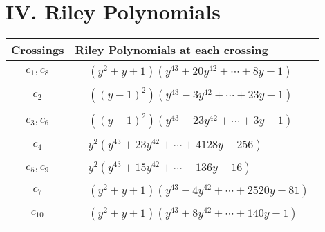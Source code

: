 \documentclass[1p]{elsarticle_modified}
\theoremstyle{definition}
\begin{document}
\centering \section*{ IV. Riley Polynomials}
\begin{tabular}{m{50pt}|m{274pt}}
Crossings & \hspace{64pt}Riley Polynomials at each crossing \\
\hline $$\begin{aligned}c_{1},c_{8}\end{aligned}$$&$\begin{aligned}
&(y^2+y+1)(y^{43}+20 y^{42}+\cdots+8 y-1)
\end{aligned}$\\
\hline $$\begin{aligned}c_{2}\end{aligned}$$&$\begin{aligned}
&((y-1)^2)(y^{43}-3 y^{42}+\cdots+23 y-1)
\end{aligned}$\\
\hline $$\begin{aligned}c_{3},c_{6}\end{aligned}$$&$\begin{aligned}
&((y-1)^2)(y^{43}-23 y^{42}+\cdots+3 y-1)
\end{aligned}$\\
\hline $$\begin{aligned}c_{4}\end{aligned}$$&$\begin{aligned}
&y^2(y^{43}+23 y^{42}+\cdots+4128 y-256)
\end{aligned}$\\
\hline $$\begin{aligned}c_{5},c_{9}\end{aligned}$$&$\begin{aligned}
&y^2(y^{43}+15 y^{42}+\cdots-136 y-16)
\end{aligned}$\\
\hline $$\begin{aligned}c_{7}\end{aligned}$$&$\begin{aligned}
&(y^2+y+1)(y^{43}-4 y^{42}+\cdots+2520 y-81)
\end{aligned}$\\
\hline $$\begin{aligned}c_{10}\end{aligned}$$&$\begin{aligned}
&(y^2+y+1)(y^{43}+8 y^{42}+\cdots+140 y-1)
\end{aligned}$\\
\hline
\end{tabular}
\vskip 2pc
\end{document}
